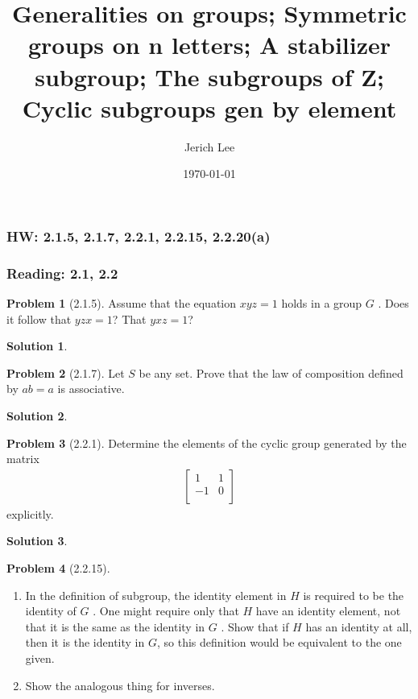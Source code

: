 \documentclass[12pt]{article}
\title{Generalities on groups; Symmetric groups on n letters; A stabilizer subgroup; The subgroups of Z; Cyclic subgroups gen by element}
\author{Jerich Lee}
\date{\today}
\theoremstyle{definition} %
\newtheorem{solution}{Solution}
\newtheorem{problem}{Problem}
\theoremstyle{plain} %
\begin{document}
\maketitle
\subsubsection*{HW: 2.1.5, 2.1.7, 2.2.1, 2.2.15, 2.2.20(a)} 
\subsubsection*{Reading: 2.1, 2.2} 

\begin{problem}[2.1.5]
    Assume that the equation $xyz=1$ holds in a group $G$ . Does it follow that $yzx=1$? That $yxz=1$?
\end{problem}
\begin{solution}
    
\end{solution}
\begin{problem}[2.1.7]
    Let $S$ be any set. Prove that the law of composition defined by $ab=a$ is associative.
\end{problem}
\begin{solution}
    
\end{solution}
\begin{problem}[2.2.1]
   Determine the elements of the cyclic group generated by the matrix 
   \begin{align}
    \begin{bmatrix}
        1 &  1 \\
        -1 &  0 \\
    \end{bmatrix}
   \end{align} 
   explicitly.
\end{problem}
\begin{solution}
    
\end{solution}
\begin{problem}[2.2.15]
   \noindent
   \begin{enumerate}
    \item In the definition of subgroup, the identity element in $H$ is required to be the identity of $G$ . One might require only that $H$ have an identity element, not that it is the same as the identity in $G$ . Show that if $H$ has an identity at all, then it is the identity in $G$, so this definition would be equivalent to the one given.
    \item Show the analogous thing for inverses.
   \end{enumerate} 
\end{problem}
\end{document}
